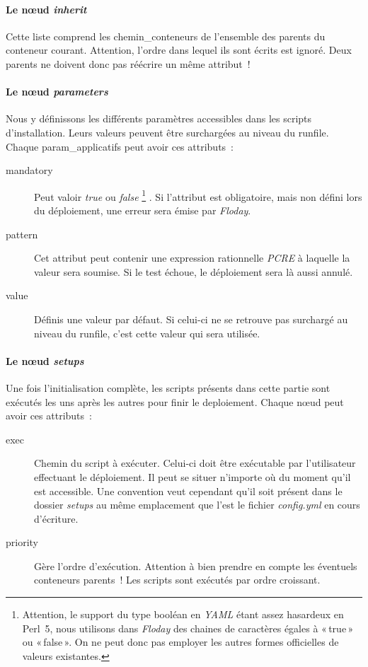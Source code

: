 \paragraph{Le nœud \emph{inherit}}
Cette liste comprend les \glspl{chemin_conteneur} de l'ensemble des parents du conteneur courant.
Attention, l'ordre dans lequel ils sont écrits est ignoré.
Deux parents ne doivent donc pas réécrire un même \gls{attribut} !

\paragraph{Le nœud \emph{parameters}}
Nous y définissons les différents paramètres accessibles dans les scripts d'installation. Leurs valeurs peuvent être surchargées au niveau du \gls{runfile}.
Chaque \gls{param_applicatifs} peut avoir ces attributs~:
\begin{description}
	\item[mandatory] Peut valoir \emph{true} ou \emph{false}%
		\footnote{Attention, le support du type booléan en \emph{YAML} étant assez hasardeux en Perl~5, nous utilisons dans \emph{Floday} des chaines de caractères égales à «\,true\,» ou «\,false\,». On ne peut donc pas employer les autres formes officielles de valeurs existantes.}%
		. Si l'attribut est obligatoire, mais non défini lors du déploiement, une erreur sera émise par \emph{Floday}.
	\item[pattern] Cet attribut peut contenir une expression rationnelle \emph{PCRE} à laquelle la valeur sera soumise. Si le test échoue, le déploiement sera là aussi annulé.
	\item[value] Définis une valeur par défaut. Si celui-ci ne se retrouve pas surchargé au niveau du \gls{runfile}, c'est cette valeur qui sera utilisée.
\end{description}

\paragraph{Le nœud \emph{setups}}
Une fois l'\gls{initialisation} complète, les scripts présents dans cette partie sont exécutés les uns après les autres pour finir le \gls{deploiement}.
Chaque nœud peut avoir ces attributs~:
\begin{description}
	\item[exec] Chemin du script à exécuter. Celui-ci doit être exécutable par l'utilisateur effectuant le déploiement. Il peut se situer n'importe où du moment qu'il est accessible. Une convention veut cependant qu'il soit présent dans le dossier \emph{setups} au même emplacement que l'est le fichier \emph{config.yml} en cours d'écriture.
	\item[priority] Gère l'ordre d'exécution. Attention à bien prendre en compte les éventuels conteneurs parents~! Les scripts sont exécutés par ordre croissant.
\end{description}

